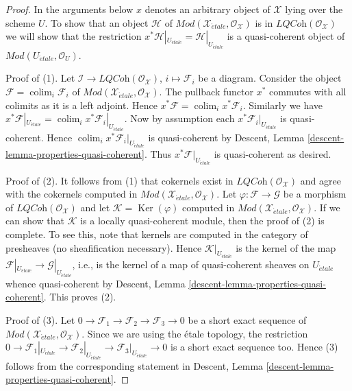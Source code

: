 \documentclass[10pt,a4paper]{amsart}
\theoremstyle{plain}
\theoremstyle{definition}
\theoremstyle{remark}
\numberwithin{equation}{subsection}
\def\colim{\mathop{\mathrm{colim}}\nolimits}
\def\etale{{\acute{e}tale}}
\def\Ker{\mathop{\mathrm{Ker}}}
\begin{document}
\begin{proof}
In the arguments below $x$ denotes an arbitrary object of $\mathcal{X}$
lying over the scheme $U$. To show that an object $\mathcal{H}$
of $\textit{Mod}(\mathcal{X}_\etale, \mathcal{O}_\mathcal{X})$ is
in $\textit{LQCoh}(\mathcal{O}_\mathcal{X})$ we will show that the
restriction $x^*\mathcal{H}|_{U_\etale} = \mathcal{H}|_{U_\etale}$
is a quasi-coherent object of $\textit{Mod}(U_\etale, \mathcal{O}_U)$.

\medskip\noindent
Proof of (1). Let $\mathcal{I} \to \textit{LQCoh}(\mathcal{O}_\mathcal{X})$,
$i \mapsto \mathcal{F}_i$ be a diagram.
Consider the object $\mathcal{F} = \colim_i \mathcal{F}_i$ of
$\textit{Mod}(\mathcal{X}_\etale, \mathcal{O}_\mathcal{X})$.
The pullback functor $x^*$ commutes with all colimits
as it is a left adjoint. Hence
$x^*\mathcal{F} = \colim_i x^*\mathcal{F}_i$. Similarly we have
$x^*\mathcal{F}|_{U_\etale} =
\colim_i x^*\mathcal{F}_i|_{U_\etale}$.
Now by assumption each $x^*\mathcal{F}_i|_{U_\etale}$
is quasi-coherent. Hence $\colim_i x^*\mathcal{F}_i|_{U_\etale}$
is quasi-coherent by
Descent, Lemma \ref{descent-lemma-properties-quasi-coherent}.
Thus $x^*\mathcal{F}|_{U_\etale}$ is quasi-coherent as desired.

\medskip\noindent
Proof of (2). It follows from (1) that cokernels exist in
$\textit{LQCoh}(\mathcal{O}_\mathcal{X})$ and agree with the cokernels computed
in $\textit{Mod}(\mathcal{X}_\etale, \mathcal{O}_\mathcal{X})$.
Let $\varphi : \mathcal{F} \to \mathcal{G}$ be a morphism of
$\textit{LQCoh}(\mathcal{O}_\mathcal{X})$ and let
$\mathcal{K} = \Ker(\varphi)$ computed in
$\textit{Mod}(\mathcal{X}_\etale, \mathcal{O}_\mathcal{X})$.
If we can show that $\mathcal{K}$ is a locally quasi-coherent module,
then the proof of (2) is complete. To see this, note that kernels
are computed in the category of presheaves (no sheafification necessary).
Hence $\mathcal{K}|_{U_\etale}$ is the kernel of the map
$\mathcal{F}|_{U_\etale} \to \mathcal{G}|_{U_\etale}$,
i.e., is the kernel of a map of quasi-coherent sheaves on $U_\etale$
whence quasi-coherent by
Descent, Lemma \ref{descent-lemma-properties-quasi-coherent}.
This proves (2).

\medskip\noindent
Proof of (3). Let
$0 \to \mathcal{F}_1 \to \mathcal{F}_2 \to \mathcal{F}_3 \to 0$
be a short exact sequence of
$\textit{Mod}(\mathcal{X}_\etale, \mathcal{O}_\mathcal{X})$.
Since we are using the \'etale topology, the restriction
$0 \to \mathcal{F}_1|_{U_\etale} \to
\mathcal{F}_2|_{U_\etale} \to \mathcal{F}_3|_{U_\etale} \to 0$
is a short exact sequence too. Hence (3) follows from the corresponding
statement in
Descent, Lemma \ref{descent-lemma-properties-quasi-coherent}.


\end{proof}
\end{document}
